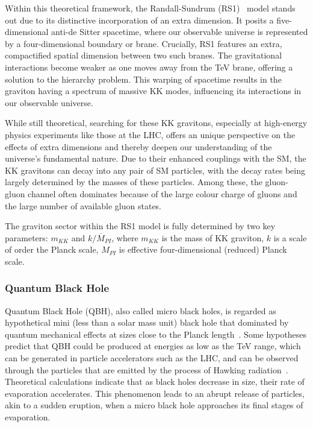 \documentclass[UTF8,12pt]{ctexart}
\numberwithin{equation}{section}
\begin{document}
Within this theoretical framework, the Randall-Sundrum (RS1)~\cite{Randall:1999ee} model stands out due to its distinctive incorporation of an extra dimension. It posits a five-dimensional anti-de Sitter spacetime, where our observable universe is represented by a four-dimensional boundary or brane. Crucially, RS1 features an extra, compactified spatial dimension between two such branes. The gravitational interactions become weaker as one moves away from the TeV brane, offering a solution to the hierarchy problem. This warping of spacetime results in the graviton having a spectrum of massive KK modes, influencing its interactions in our observable universe.


While still theoretical, searching for these KK gravitons, especially at high-energy physics experiments like those at the LHC, offers an unique perspective on the effects of extra dimensions and thereby deepen our understanding of the universe's fundamental nature. Due to their enhanced couplings with the SM, the KK gravitons can decay into any pair of SM particles, with the decay rates being largely determined by the masses of these particles. Among these, the gluon-gluon channel often dominates because of the large colour charge of gluons and the large number of available gluon states.

The graviton sector within the RS1 model is fully determined by two key parameters: $m_{KK}$ and $k/\overline{M}_{PI}$, where $m_{KK}$ is the mass of KK graviton, $k$ is a scale of order the Planck scale, ${M}_{PI}$ is effective four-dimensional (reduced) Planck scale.


\subsubsection{Quantum Black Hole}
\label{sec:2.2.3}

Quantum Black Hole (QBH), also called micro black holes, is regarded as hypothetical mini (less than a solar mass unit) black hole that dominated by quantum mechanical effects at sizes close to the Planck length~\cite{10.1093/mnras/152.1.75}. Some hypotheses predict that QBH could be produced at energies as low as the TeV range, which can be generated in particle accelerators such as the LHC, and can be observed through the particles that are emitted by the process of Hawking radiation~\cite{Hawking:1975vcx}. Theoretical calculations indicate that as black holes decrease in size, their rate of evaporation accelerates. This phenomenon leads to an abrupt release of particles, akin to a sudden eruption, when a micro black hole approaches its final stages of evaporation.
\end{document}
